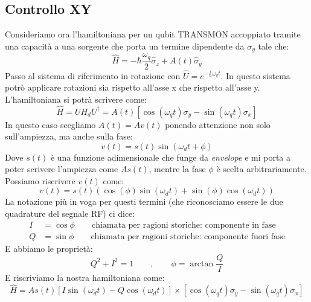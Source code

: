 \subsection{Controllo XY}
Consideriamo ora l'hamiltoniana per un qubit TRANSMON accoppiato tramite una capacità a una sorgente che porta un termine dipendente da $\sigma_y$ tale che:
\begin{equation*}
    \hat H= - \hbar \frac{\omega_q}{2}\hat \sigma_z + A(t) \hat \sigma_y
\end{equation*}
Passo al sistema di riferimento in rotazione con $\hat U = e^{-\frac{i}{\hbar}\omega_q t}$.
In questo sistema potrò applicare rotazioni sia rispetto all'asse x che rispetto all'asse y.
L'hamiltoniana si potrà scrivere come:
\begin{equation*}
    \hat H = U H_d U^\dagger = A(t) \left[ \cos \left( \omega_q t \right)\sigma_y -  \sin \left( \omega_q t \right)\sigma_x \right]
\end{equation*}
In questo caso scegliamo $A(t) = A v(t)$ ponendo attenzione non solo sull'ampiezza, ma anche sulla fase:
\begin{equation*}
    v(t) = s(t) \sin \left( \omega_d t + \phi \right)
\end{equation*}
Dove $s(t)$ è una funzione adimensionale che funge da \textit{envelope} e mi porta a poter scrivere l'ampiezza come $As(t)$, mentre la fase $\phi$ è scelta arbitrariamente.
Possiamo riscrivere $v(t)$ come:
\begin{equation*}
    v(t) = s(t) \left( \cos (\phi) \sin (\omega_d t) + \sin (\phi) \cos (\omega_d t) \right)
\end{equation*}
La notazione più in voga per questi termini (che riconosciamo essere le due quadrature del segnale RF) ci dice:
\begin{align*}
    I &= \cos \phi \qquad \text{chiamata per ragioni storiche: componente in fase} \\
    Q &= \sin \phi \qquad \text{chiamata per ragioni storiche: componente fuori fase} 
\end{align*}
E abbiamo le proprietà:
\begin{equation*}
    Q^2 + I^2 = 1 \qquad , \qquad \phi = \arctan\frac{Q}{I}
\end{equation*}
E riscriviamo la nostra hamiltoniana come:
\begin{equation*}
    \hat H = As(t) \left[  I \sin (\omega_d t) - Q \cos (\omega_d t)  \right]\times \left[ \cos (\omega_q t) \sigma_y - \sin (\omega_q t) \sigma_x \right]
\end{equation*}
